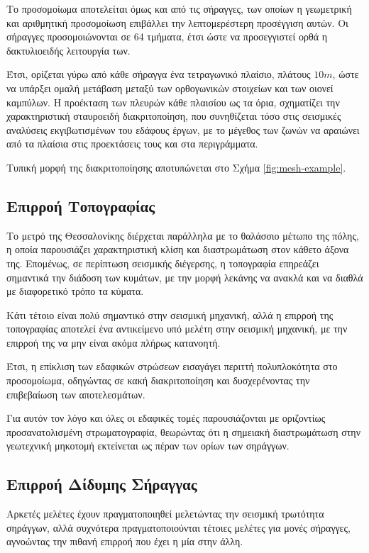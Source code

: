 Το προσομοίωμα αποτελείται όμως και από τις σήραγγες, των οποίων η γεωμετρική και αριθμητική προσομοίωση επιβάλλει την λεπτομερέστερη προσέγγιση αυτών. Οι σήραγγες προσομοιώνονται σε 64 τμήματα, έτσι ώστε να προσεγγιστεί ορθά η δακτυλιοειδής λειτουργία των.

Έτσι, ορίζεται γύρω από κάθε σήραγγα ένα τετραγωνικό πλαίσιο, πλάτους $10m$, ώστε να υπάρξει ομαλή μετάβαση μεταξύ των ορθογωνικών στοιχείων και των οιονεί καμπύλων. Η προέκταση των πλευρών κάθε πλαισίου ως τα όρια, σχηματίζει την χαρακτηριστική σταυροειδή διακριτοποίηση, που συνηθίζεται τόσο στις σεισμικές αναλύσεις εκγιβωτισμένων του εδάφους έργων, με το μέγεθος των ζωνών να αραιώνει από τα πλαίσια στις προεκτάσεις τους και στα περιγράμματα.

Τυπική μορφή της διακριτοποίησης αποτυπώνεται στο Σχήμα \ref{fig:mesh-example}.

\subsection{Επιρροή Τοπογραφίας}

Το μετρό της Θεσσαλονίκης διέρχεται παράλληλα με το θαλάσσιο μέτωπο της πόλης, η οποία παρουσιάζει χαρακτηριστική κλίση και διαστρωμάτωση στον κάθετο άξονα της. Επομένως, σε περίπτωση σεισμικής διέγερσης, η τοπογραφία επηρεάζει σημαντικά την διάδοση των κυμάτων, με την μορφή λεκάνης να ανακλά και να διαθλά με διαφορετικό τρόπο τα κύματα.

Κάτι τέτοιο είναι πολύ σημαντικό στην σεισμική μηχανική, αλλά η επιρροή της τοπογραφίας αποτελεί ένα αντικείμενο υπό μελέτη στην σεισμική μηχανική, με την επιρροή της να μην είναι ακόμα πλήρως κατανοητή.

Έτσι, η επίκλιση των εδαφικών στρώσεων εισαγάγει περιττή πολυπλοκότητα στο προσομοίωμα, οδηγώντας σε κακή διακριτοποίηση και δυσχερένοντας την επιβεβαίωση των αποτελεσμάτων.

Για αυτόν τον λόγο και όλες οι εδαφικές τομές παρουσιάζονται με οριζοντίως προσανατολισμένη στρωματογραφία, θεωρώντας ότι η σημειακή διαστρωμάτωση στην γεωτεχνική μηκοτομή εκτείνεται ως πέραν των ορίων των σηράγγων.

\subsection{Επιρροή Δίδυμης Σήραγγας}

Αρκετές μελέτες έχουν πραγματοποιηθεί μελετώντας την σεισμική τρωτότητα σηράγγων, αλλά συχνότερα πραγματοποιούνται τέτοιες μελέτες για μονές σήραγγες, αγνοώντας την πιθανή επιρροή που έχει η μία στην άλλη.

